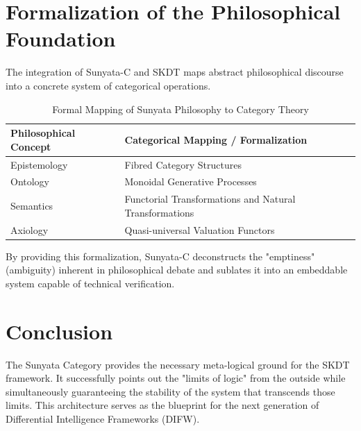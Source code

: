 \documentclass[12pt,a4paper]{article}
\begin{document}
\section{Formalization of the Philosophical Foundation}
The integration of Sunyata-C and SKDT maps abstract philosophical discourse into a concrete system of categorical operations.

\begin{table}[h]
\centering
\begin{tabular}{|l|l|}
\hline
\textbf{Philosophical Concept} & \textbf{Categorical Mapping / Formalization} \\ \hline
Epistemology & Fibred Category Structures \\ \hline
Ontology & Monoidal Generative Processes \\ \hline
Semantics & Functorial Transformations and Natural Transformations \\ \hline
Axiology & Quasi-universal Valuation Functors \\ \hline
\end{tabular}
\caption{Formal Mapping of Sunyata Philosophy to Category Theory}
\end{table}

By providing this formalization, Sunyata-C deconstructs the "emptiness" (ambiguity) inherent in philosophical debate and sublates it into an embeddable system capable of technical verification.

\section{Conclusion}
The Sunyata Category provides the necessary meta-logical ground for the SKDT framework. It successfully points out the "limits of logic" from the outside while simultaneously guaranteeing the stability of the system that transcends those limits. This architecture serves as the blueprint for the next generation of Differential Intelligence Frameworks (DIFW).
\end{document}
